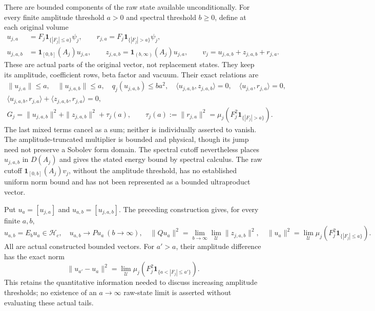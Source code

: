 \documentclass[11pt]{article}
\begin{document}
There are bounded components of the raw state available unconditionally. For every finite amplitude threshold \(a>0\) and spectral threshold \(b\ge0\), define at each original volume
\[
\begin{aligned}
 u_{j,a}&=F_j\mathbf1_{\{|F_j|\le a\}}\psi_j,\qquad
 r_{j,a}=F_j\mathbf1_{\{|F_j|>a\}}\psi_j,\\
 u_{j,a,b}&=\mathbf1_{[0,b]}(A_j)u_{j,a},\qquad
 z_{j,a,b}=\mathbf1_{(b,\infty)}(A_j)u_{j,a},\qquad
 v_j=u_{j,a,b}+z_{j,a,b}+r_{j,a}.
\end{aligned}\tag{ASL59}
\]
These are actual parts of the original vector, not replacement states. They keep its amplitude, coefficient rows, beta factor and vacuum. Their exact relations are
\[
\begin{gathered}
 \|u_{j,a}\|\le a,\quad\|u_{j,a,b}\|\le a,\quad
 q_j(u_{j,a,b})\le ba^2,\quad
 \langle u_{j,a,b},z_{j,a,b}\rangle=0,\quad
 \langle u_{j,a},r_{j,a}\rangle=0,\\
 \langle u_{j,a,b},r_{j,a}\rangle+
 \langle z_{j,a,b},r_{j,a}\rangle=0,\\
 G_j=\|u_{j,a,b}\|^2+\|z_{j,a,b}\|^2+\tau_j(a),\qquad
 \tau_j(a):=\|r_{j,a}\|^2=\mu_j(F_j^2\mathbf1_{\{|F_j|>a\}}).
\end{gathered}\tag{ASL60}
\]
The last mixed terms cancel as a sum; neither is individually asserted to vanish. The amplitude-truncated multiplier is bounded and physical, though its jump need not preserve a Sobolev form domain. The spectral cutoff nevertheless places \(u_{j,a,b}\) in \(D(A_j)\) and gives the stated energy bound by spectral calculus. The raw cutoff \(\mathbf1_{[0,b]}(A_j)v_j\), without the amplitude threshold, has no established uniform norm bound and has not been represented as a bounded ultraproduct vector.

Put \(u_a=[u_{j,a}]\) and \(u_{a,b}=[u_{j,a,b}]\). The preceding construction gives, for every finite \(a,b\),
\[
 u_{a,b}=E_bu_a\in\mathcal H_c,\quad
 u_{a,b}\longrightarrow Pu_a\ (b\to\infty),\quad
 \|Qu_a\|^2=\lim_{b\to\infty}\lim_{\mathcal U}\|z_{j,a,b}\|^2,
 \quad
 \|u_a\|^2=\lim_{\mathcal U}\mu_j(F_j^2\mathbf1_{\{|F_j|\le a\}}).
 \tag{ASL61}
\]
All are actual constructed bounded vectors. For \(a'>a\), their amplitude difference has the exact norm
\[
 \|u_{a'}-u_a\|^2
 =\lim_{\mathcal U}\mu_j(F_j^2\mathbf1_{\{a<|F_j|\le a'\}}).
 \tag{ASL62}
\]
This retains the quantitative information needed to discuss increasing amplitude thresholds; no existence of an \(a\to\infty\) raw-state limit is asserted without evaluating these actual tails.
\end{document}
